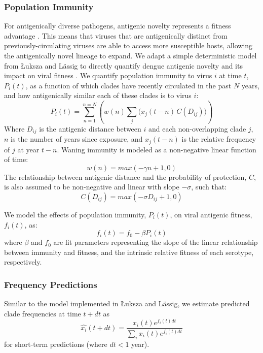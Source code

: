 \documentclass[11pt,oneside,letterpaper]{article}
\begin{document}
\subsubsection{Population Immunity}
For antigenically diverse pathogens, antigenic novelty represents a fitness advantage \citep{lipsitch2007patterns}.
This means that viruses that are antigenically distinct from previously-circulating viruses are able to access more susceptible hosts, allowing the antigenically novel lineage to expand.
We adapt a simple deterministic model from {\L}uksza and L\"assig to directly quantify dengue antigenic novelty and its impact on viral fitness \citep{luksza2014predictive}.
We quantify population immunity to virus $i$ at time $t$, $P_i(t)$, as a function of which clades have recently circulated in the past $N$ years, and how antigenically similar each of these clades is to virus $i$:
\begin{equation}
  \label{eq_population_immunity}
P_i(t) = \sum_{n=1}^{n=N} \left(w(n)  \sum_{j} \Big( x_j(t-n) \, C( D_{ij}) \Big) \right)
\end{equation}
Where $D_{ij}$ is the antigenic distance between $i$ and each non-overlapping clade $j$, $n$ is the number of years since exposure, and $x_j(t-n)$ is the relative frequency of $j$ at year $t-n$.
Waning immunity is modeled as a non-negative linear function of time:
\begin{equation}
\label{eq_waning_immunity}
  w(n) = max(-\gamma n + 1, 0)
\end{equation}
The relationship between antigenic distance and the probability of protection, $C$, is also assumed to be non-negative and linear with slope $-\sigma$, such that:
\begin{equation}
C(D_{ij}) = max(-\sigma D_{ij} + 1, 0)
\end{equation}

We model the effects of population immunity, $P_i(t)$, on viral antigenic fitness, $f_i(t)$, as:
\begin{equation}
  \label{eq_fitness}
f_i(t) = f_0-\beta P_i(t)
\end{equation}
where $\beta$ and $f_0$ are fit parameters representing the slope of the linear relationship between immunity and fitness, and the intrinsic relative fitness of each serotype, respectively.

\subsubsection{Frequency Predictions}
Similar to the model implemented in {\L}uksza and L\"assig, we estimate predicted clade frequencies at time $t + dt$ as
\begin{equation}
  \label{eq_predict_frequency}
\hat{x_i}(t+dt) = \frac{x_i(t) e^{f_i(t) dt}}{\sum_{i}x_i(t) e^{f_i(t) dt}}
\end{equation}
for short-term predictions (where $dt < 1$ year).
\end{document}
